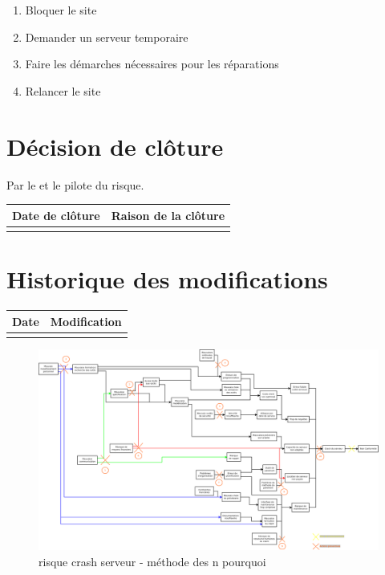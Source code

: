 \begin{enumerate}
	\item Bloquer le site
	\item Demander un serveur temporaire
	\item Faire les démarches nécessaires pour les réparations
	\item Relancer le site
\end{enumerate}

\section*{Décision de clôture}
Par le \CP{} et le pilote du risque.
\begin{table}[H]
\centering
	\begin{tabularx}{16.8cm}{|X|X|}
	\hline
	\rowcolor{gray!40} Date de clôture & Raison de la clôture \\
	\hline
	  & \\
	\hline
	\end{tabularx}
\end{table}

\section*{Historique des modifications}
\begin{table}[H]
\centering
	\begin{tabularx}{16.8cm}{|X|X|}
	\hline
	Date & Modification \\
	\hline
	  & \\
	\hline
	\end{tabularx}
\end{table}
\newpage

\begin{landscape}
\begin{figure}
	\centering
	\includegraphics[scale=0.24]{images/AnalyseRisque_nPourquoi_FDR001}
        \caption{\label{risque crash serveur}risque crash serveur - méthode des n pourquoi}
\end{figure}
\end{landscape}

